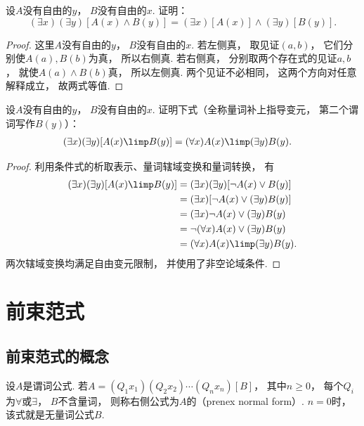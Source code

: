 \begin{example}
    设\(A\)没有自由的\(y\)，
    \(B\)没有自由的\(x\).
证明：\begin{equation}
	(\exists x)(\exists y)[A(x) \land B(y)]
	= (\exists x)[A(x)] \land (\exists y)[B(y)].
\end{equation}
    \begin{proof}
        这里\(A\)没有自由的\(y\)，
        \(B\)没有自由的\(x\).
        若左侧真，
        取见证\((a,b)\)，
        它们分别使\(A(a),B(b)\)为真，
        所以右侧真.
        若右侧真，
        分别取两个存在式的见证\(a,b\)，
        就使\(A(a)\land B(b)\)真，
        所以左侧真.
        两个见证不必相同，
        这两个方向对任意解释成立，
        故两式等值.
    \end{proof}
\end{example}

\begin{example}
    设\(A\)没有自由的\(y\)，
    \(B\)没有自由的\(x\).
    证明下式（全称量词补上指导变元，
    第二个谓词写作\(B(y)\)）：
    \begin{align*}
        (\exists x)(\exists y)[A(x)\limp B(y)] &= (\forall x)A(x)\limp(\exists y)B(y).
    \end{align*}
    \begin{proof}
        利用条件式的析取表示、量词辖域变换和量词转换，
        有
        \begin{align*}
            (\exists x)(\exists y)[A(x)\limp B(y)] &= (\exists x)(\exists y)[\neg A(x)\lor B(y)] \\
            &= (\exists x)[\neg A(x)\lor(\exists y)B(y)] \\
            &= (\exists x)\neg A(x)\lor(\exists y)B(y) \\
            &= \neg(\forall x)A(x)\lor(\exists y)B(y) \\
            &= (\forall x)A(x)\limp(\exists y)B(y).
        \end{align*}
        两次辖域变换均满足自由变元限制，
        并使用了非空论域条件.
    \end{proof}
\end{example}

\section{前束范式}
\subsection{前束范式的概念}
\begin{definition}
    设\(A\)是谓词公式.
    若\(A=(Q_1x_1)(Q_2x_2)\dotsm(Q_nx_n)[B]\)，
    其中\(n\geq0\)，
    每个\(Q_i\)为\(\forall\)或\(\exists\)，
    \(B\)不含量词，
    则称右侧公式为\(A\)的（prenex normal form）.
    \(n=0\)时，
    该式就是无量词公式\(B\).
\end{definition}

